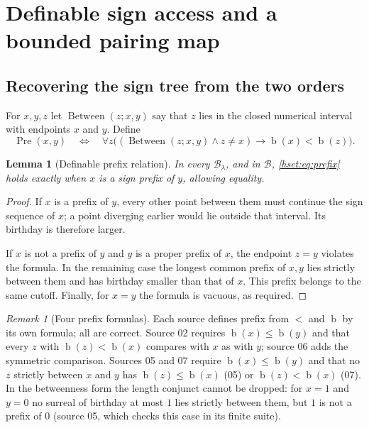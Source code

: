 \documentclass[11pt,letterpaper]{article}
\newtheorem{lemma}[lemma]{Lemma}\aliascntresetthe{lemma}
\theoremstyle{definition}
\theoremstyle{remark}
\newtheorem{remark}[remark]{Remark}\aliascntresetthe{remark}
\newcommand{\bd}{\operatorname{b}}
\newcommand{\B}{\mathcal B}
\newcommand{\Pre}{\operatorname{Pre}}
\begin{document}
\section{Definable sign access and a bounded pairing map}
\label{hset:sec:bits}

\subsection{Recovering the sign tree from the two orders}

For $x,y,z$ let $\operatorname{Between}(z;x,y)$ say that $z$ lies in the closed
numerical interval with endpoints $x$ and $y$. Define
\begin{equation}
 \Pre(x,y)\quad\Longleftrightarrow\quad
 \forall z\bigl((\operatorname{Between}(z;x,y)\land z\ne x)
                 \longrightarrow\bd(x)<\bd(z)\bigr).
 \label{hset:eq:prefix}
\end{equation}

\begin{lemma}[Definable prefix relation]
\label{hset:lem:prefix}
In every $\B_\lambda$, and in $\B$, \eqref{hset:eq:prefix} holds exactly when
$x$ is a sign prefix of $y$, allowing equality.
\end{lemma}
\begin{proof}
If $x$ is a prefix of $y$, every other point between them must continue the
sign sequence of $x$; a point diverging earlier would lie outside that
interval. Its birthday is therefore larger.

If $x$ is not a prefix of $y$ and $y$ is a proper prefix of $x$, the endpoint
$z=y$ violates the formula. In the remaining case the longest common prefix
of $x,y$ lies strictly between them and has birthday smaller than that of
$x$. This prefix belongs to the same cutoff. Finally, for $x=y$ the formula
is vacuous, as required.
\end{proof}

\begin{remark}[Four prefix formulas]\label{hset:rem:prefixes}
Each source defines prefix from $<$ and $\bd$ by its own formula; all are
correct. Source 02 requires $\bd(x)\le\bd(y)$ and that every $z$ with
$\bd(z)<\bd(x)$ compares with $x$ as with $y$; source 06 adds the symmetric
comparison. Sources 05 and 07 require $\bd(x)\le\bd(y)$ and that no $z$
strictly between $x$ and $y$ has $\bd(z)\le\bd(x)$ (05) or $\bd(z)<\bd(x)$
(07). In the betweenness form the length conjunct cannot be dropped: for
$x=1$ and $y=0$ no surreal of birthday at most $1$ lies strictly between them,
but $1$ is not a prefix of $0$ (source 05, which checks this case in its finite
suite).
\end{remark}
\end{document}
